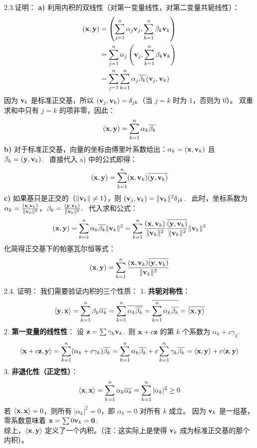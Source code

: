 \begin{exer}
2.3.证明：
\textbf{a)}
利用内积的双线性（对第一变量线性，对第二变量共轭线性）：
$$
\begin{aligned}
(\mathbf{x}, \mathbf{y}) &= \left( \sum_{j=1}^n \alpha_j \mathbf{v}_j, \sum_{k=1}^n \beta_k \mathbf{v}_k \right) \\
&= \sum_{j=1}^n \alpha_j \left( \mathbf{v}_j, \sum_{k=1}^n \beta_k \mathbf{v}_k \right) \\
&= \sum_{j=1}^n \sum_{k=1}^n \alpha_j \overline{\beta_k} (\mathbf{v}_j, \mathbf{v}_k)
\end{aligned}
$$
因为 $\mathbf{v}_k$ 是标准正交基，所以 $(\mathbf{v}_j, \mathbf{v}_k) = \delta_{jk}$（当 $j=k$ 时为 1，否则为 0）。
双重求和中只有 $j=k$ 的项非零，因此：
$$ (\mathbf{x}, \mathbf{y}) = \sum_{k=1}^n \alpha_k \overline{\beta_k} $$
\textbf{b)}
对于标准正交基，向量的坐标由傅里叶系数给出：$\alpha_k = (\mathbf{x}, \mathbf{v}_k)$ 且 $\beta_k = (\mathbf{y}, \mathbf{v}_k)$.~
直接代入 a) 中的公式即得：
$$ (\mathbf{x}, \mathbf{y}) = \sum_{k=1}^n (\mathbf{x}, \mathbf{v}_k)\overline{(\mathbf{y}, \mathbf{v}_k)} $$
\textbf{c)}
如果基只是正交的（$\|\mathbf{v}_k\| \neq 1$），则 $(\mathbf{v}_j, \mathbf{v}_k) = \|\mathbf{v}_k\|^2 \delta_{jk}$.~
此时，坐标系数为 $\alpha_k = \frac{(\mathbf{x}, \mathbf{v}_k)}{\|\mathbf{v}_k\|^2}$，$\beta_k = \frac{(\mathbf{y}, \mathbf{v}_k)}{\|\mathbf{v}_k\|^2}$.~
代入求和公式：
$$ (\mathbf{x}, \mathbf{y}) = \sum_{k=1}^n \alpha_k \overline{\beta_k} \|\mathbf{v}_k\|^2 = \sum_{k=1}^n \frac{(\mathbf{x}, \mathbf{v}_k)}{\|\mathbf{v}_k\|^2} \frac{\overline{(\mathbf{y}, \mathbf{v}_k)}}{\|\mathbf{v}_k\|^2} \|\mathbf{v}_k\|^2 $$
化简得正交基下的帕塞瓦尔恒等式：
$$ (\mathbf{x}, \mathbf{y}) = \sum_{k=1}^n \frac{(\mathbf{x}, \mathbf{v}_k)\overline{(\mathbf{y}, \mathbf{v}_k)}}{\|\mathbf{v}_k\|^2} $$

2.4. 证明：
我们需要验证内积的三个性质：
1.  \textbf{共轭对称性}：
    $$ \langle \mathbf{y}, \mathbf{x} \rangle = \sum_{k=1}^n \beta_k \overline{\alpha_k} = \sum_{k=1}^n \overline{\alpha_k \overline{\beta_k}} = \overline{\sum_{k=1}^n \alpha_k \overline{\beta_k}} = \overline{\langle \mathbf{x}, \mathbf{y} \rangle} $$
2.  \textbf{第一变量的线性性}：
    设 $\mathbf{z} = \sum \gamma_k \mathbf{v}_k$.~则 $\mathbf{x} + c\mathbf{z}$ 的第 $k$ 个系数为 $\alpha_k + c\gamma_k$.~
    $$ \langle \mathbf{x} + c\mathbf{z}, \mathbf{y} \rangle = \sum_{k=1}^n (\alpha_k + c\gamma_k) \overline{\beta_k} = \sum_{k=1}^n \alpha_k \overline{\beta_k} + c \sum_{k=1}^n \gamma_k \overline{\beta_k} = \langle \mathbf{x}, \mathbf{y} \rangle + c \langle \mathbf{z}, \mathbf{y} \rangle $$
3.  \textbf{非退化性（正定性）}：
    $$ \langle \mathbf{x}, \mathbf{x} \rangle = \sum_{k=1}^n \alpha_k \overline{\alpha_k} = \sum_{k=1}^n |\alpha_k|^2 \ge 0 $$
    若 $\langle \mathbf{x}, \mathbf{x} \rangle = 0$，则所有 $|\alpha_k|^2 = 0$，即 $\alpha_k = 0$ 对所有 $k$ 成立。
    因为 $\mathbf{v}_k$ 是一组基，零系数意味着 $\mathbf{x} = \sum 0 \mathbf{v}_k = \mathbf{0}$.~
    \\
综上，$\langle \mathbf{x}, \mathbf{y} \rangle$ 定义了一个内积。（注：这实际上是使得 $\mathbf{v}_k$ 成为标准正交基的那个内积）。


\end{exer}
